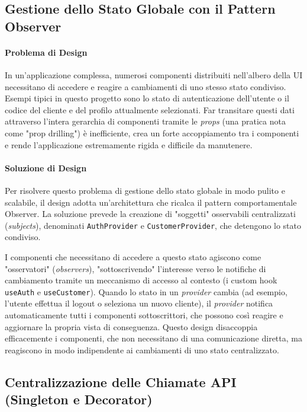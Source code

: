 \documentclass[12pt,a4paper,openright,twoside]{book}
\begin{document}
\subsection{Gestione dello Stato Globale con il Pattern Observer}
\label{subsec:design_observer_frontend}

\paragraph{Problema di Design}
In un'applicazione complessa, numerosi componenti distribuiti nell'albero della UI necessitano di accedere e reagire a cambiamenti di uno stesso stato condiviso. Esempi tipici in questo progetto sono lo stato di autenticazione dell'utente o il codice del cliente e del profilo attualmente selezionati. Far transitare questi dati attraverso l'intera gerarchia di componenti tramite le \textit{props} (una pratica nota come "prop drilling") è inefficiente, crea un forte accoppiamento tra i componenti e rende l'applicazione estremamente rigida e difficile da manutenere.

\paragraph{Soluzione di Design}
Per risolvere questo problema di gestione dello stato globale in modo pulito e scalabile, il design adotta un'architettura che ricalca il pattern comportamentale Observer. La soluzione prevede la creazione di "soggetti" osservabili centralizzati (\textit{subjects}), denominati \texttt{AuthProvider} e \texttt{CustomerProvider}, che detengono lo stato condiviso.

I componenti che necessitano di accedere a questo stato agiscono come "osservatori" (\textit{observers}), "sottoscrivendo" l'interesse verso le notifiche di cambiamento tramite un meccanismo di accesso al contesto (i custom hook \texttt{useAuth} e \texttt{useCustomer}). Quando lo stato in un \textit{provider} cambia (ad esempio, l'utente effettua il logout o seleziona un nuovo cliente), il \textit{provider} notifica automaticamente tutti i componenti sottoscrittori, che possono così reagire e aggiornare la propria vista di conseguenza. Questo design disaccoppia efficacemente i componenti, che non necessitano di una comunicazione diretta, ma reagiscono in modo indipendente ai cambiamenti di uno stato centralizzato.

\subsection{Centralizzazione delle Chiamate API (Singleton e Decorator)}
\label{subsec:design_api_singleton_decorator}
\end{document}
